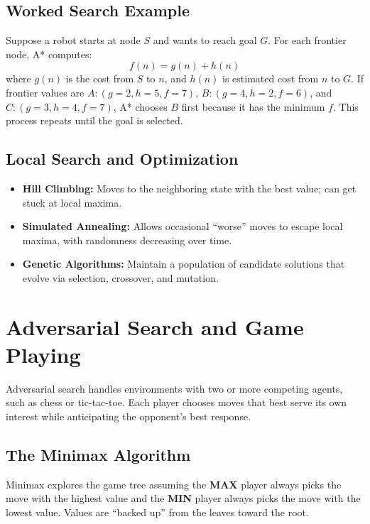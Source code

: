 \documentclass[11pt,a4paper]{article}
\begin{document}
\subsection{Worked Search Example}
\begin{examplebox}
Suppose a robot starts at node $S$ and wants to reach goal $G$. For each frontier node, A* computes:
$$f(n)=g(n)+h(n)$$
where $g(n)$ is the cost from $S$ to $n$, and $h(n)$ is estimated cost from $n$ to $G$.
If frontier values are $A:(g=2,h=5,f=7)$, $B:(g=4,h=2,f=6)$, and $C:(g=3,h=4,f=7)$, A* chooses $B$ first because it has the minimum $f$. This process repeats until the goal is selected.
\end{examplebox}

\subsection{Local Search and Optimization}
\begin{itemize}[leftmargin=*]
  \item \textbf{Hill Climbing:} Moves to the neighboring state with the best value; can get stuck at local maxima.
  \item \textbf{Simulated Annealing:} Allows occasional ``worse'' moves to escape local maxima, with randomness decreasing over time.
  \item \textbf{Genetic Algorithms:} Maintain a population of candidate solutions that evolve via selection, crossover, and mutation.
\end{itemize}

\section{Adversarial Search and Game Playing}

\begin{definitionbox}
Adversarial search handles environments with two or more competing agents, such as chess or tic-tac-toe. Each player chooses moves that best serve its own interest while anticipating the opponent's best response.
\end{definitionbox}

\subsection{The Minimax Algorithm}
\begin{definitionbox}[Minimax]
Minimax explores the game tree assuming the \textbf{MAX} player always picks the move with the highest value and the \textbf{MIN} player always picks the move with the lowest value. Values are ``backed up'' from the leaves toward the root.
\end{definitionbox}
\end{document}
